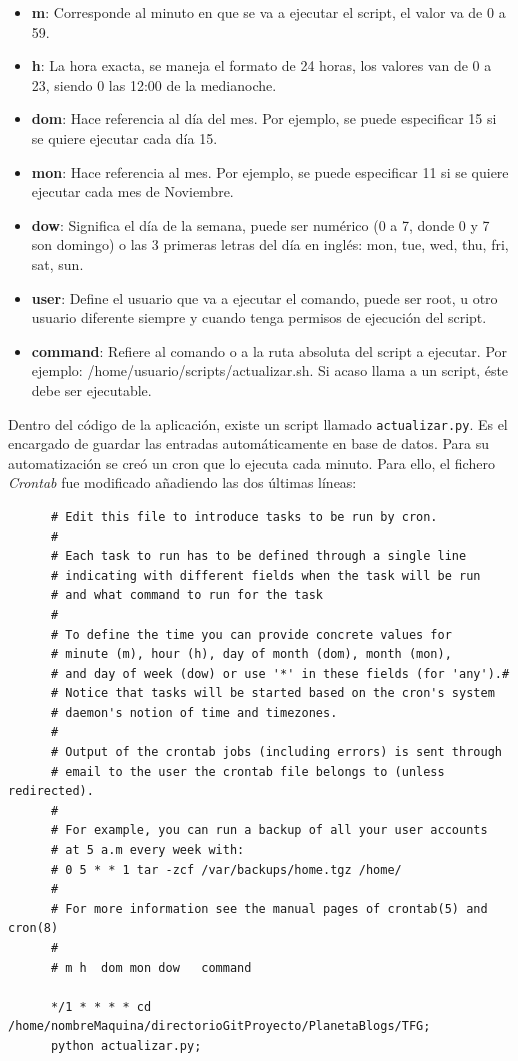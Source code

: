 \documentclass[a4paper, 12pt]{book}
\begin{document}
\begin{itemize}
  \item {\bfseries m}: Corresponde al minuto en que se va a ejecutar el script, el valor va de 0 a 59.
  \item {\bfseries h}: La hora exacta, se maneja el formato de 24 horas, los valores van de 0 a 23, siendo 0 las 12:00 de la medianoche.
  \item {\bfseries dom}: Hace referencia al d\'ia del mes. Por ejemplo, se puede especificar 15 si se quiere ejecutar cada d\'ia 15.
  \item {\bfseries mon}: Hace referencia al mes. Por ejemplo, se puede especificar 11 si se quiere ejecutar cada mes de Noviembre.
  \item {\bfseries dow}: Significa el d\'ia de la semana, puede ser num\'erico (0 a 7, donde 0 y 7 son domingo) o las 3 primeras letras del d\'ia en 
  ingl\'es: mon, tue, wed, thu, fri, sat, sun.
  \item {\bfseries user}: Define el usuario que va a ejecutar el comando, puede ser root, u otro usuario diferente siempre y cuando tenga permisos de 
  ejecuci\'on del script.
  \item {\bfseries command}: Refiere al comando o a la ruta absoluta del script a ejecutar. Por ejemplo: /home/usuario/scripts/actualizar.sh. Si acaso 
  llama a un script, \'este debe ser ejecutable.
\end{itemize}
Dentro del c\'odigo de la aplicaci\'on, existe un script llamado \texttt{actualizar.py}. Es el encargado de guardar las entradas autom\'aticamente en base
de datos. Para su automatizaci\'on se cre\'o un cron que lo ejecuta cada minuto. Para ello, el fichero \textit{Crontab} fue modificado a\~nadiendo las dos \'ultimas 
l\'ineas: 
{\footnotesize\begin{verbatim} 
      # Edit this file to introduce tasks to be run by cron.
      # 
      # Each task to run has to be defined through a single line
      # indicating with different fields when the task will be run
      # and what command to run for the task
      # 
      # To define the time you can provide concrete values for
      # minute (m), hour (h), day of month (dom), month (mon),
      # and day of week (dow) or use '*' in these fields (for 'any').# 
      # Notice that tasks will be started based on the cron's system
      # daemon's notion of time and timezones.
      # 
      # Output of the crontab jobs (including errors) is sent through
      # email to the user the crontab file belongs to (unless redirected).
      # 
      # For example, you can run a backup of all your user accounts
      # at 5 a.m every week with:
      # 0 5 * * 1 tar -zcf /var/backups/home.tgz /home/
      # 
      # For more information see the manual pages of crontab(5) and cron(8)
      # 
      # m h  dom mon dow   command
      
      */1 * * * * cd /home/nombreMaquina/directorioGitProyecto/PlanetaBlogs/TFG;
      python actualizar.py; 
\end{verbatim}}
\end{document}
